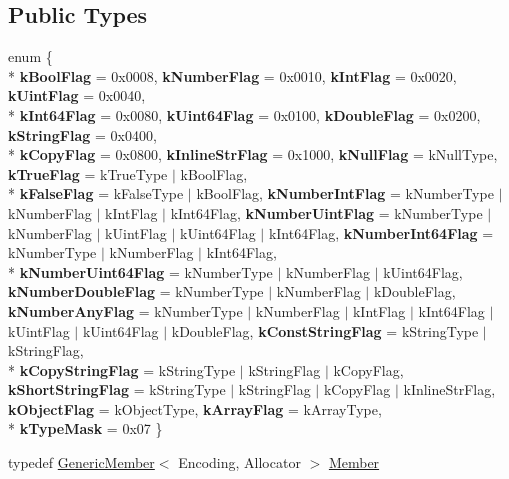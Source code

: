 \subsection*{Public Types}
\begin{DoxyCompactItemize}
\item 
enum \{ \\*
{\bfseries k\+Bool\+Flag} = 0x0008, 
{\bfseries k\+Number\+Flag} = 0x0010, 
{\bfseries k\+Int\+Flag} = 0x0020, 
{\bfseries k\+Uint\+Flag} = 0x0040, 
\\*
{\bfseries k\+Int64\+Flag} = 0x0080, 
{\bfseries k\+Uint64\+Flag} = 0x0100, 
{\bfseries k\+Double\+Flag} = 0x0200, 
{\bfseries k\+String\+Flag} = 0x0400, 
\\*
{\bfseries k\+Copy\+Flag} = 0x0800, 
{\bfseries k\+Inline\+Str\+Flag} = 0x1000, 
{\bfseries k\+Null\+Flag} = k\+Null\+Type, 
{\bfseries k\+True\+Flag} = k\+True\+Type $\vert$ k\+Bool\+Flag, 
\\*
{\bfseries k\+False\+Flag} = k\+False\+Type $\vert$ k\+Bool\+Flag, 
{\bfseries k\+Number\+Int\+Flag} = k\+Number\+Type $\vert$ k\+Number\+Flag $\vert$ k\+Int\+Flag $\vert$ k\+Int64\+Flag, 
{\bfseries k\+Number\+Uint\+Flag} = k\+Number\+Type $\vert$ k\+Number\+Flag $\vert$ k\+Uint\+Flag $\vert$ k\+Uint64\+Flag $\vert$ k\+Int64\+Flag, 
{\bfseries k\+Number\+Int64\+Flag} = k\+Number\+Type $\vert$ k\+Number\+Flag $\vert$ k\+Int64\+Flag, 
\\*
{\bfseries k\+Number\+Uint64\+Flag} = k\+Number\+Type $\vert$ k\+Number\+Flag $\vert$ k\+Uint64\+Flag, 
{\bfseries k\+Number\+Double\+Flag} = k\+Number\+Type $\vert$ k\+Number\+Flag $\vert$ k\+Double\+Flag, 
{\bfseries k\+Number\+Any\+Flag} = k\+Number\+Type $\vert$ k\+Number\+Flag $\vert$ k\+Int\+Flag $\vert$ k\+Int64\+Flag $\vert$ k\+Uint\+Flag $\vert$ k\+Uint64\+Flag $\vert$ k\+Double\+Flag, 
{\bfseries k\+Const\+String\+Flag} = k\+String\+Type $\vert$ k\+String\+Flag, 
\\*
{\bfseries k\+Copy\+String\+Flag} = k\+String\+Type $\vert$ k\+String\+Flag $\vert$ k\+Copy\+Flag, 
{\bfseries k\+Short\+String\+Flag} = k\+String\+Type $\vert$ k\+String\+Flag $\vert$ k\+Copy\+Flag $\vert$ k\+Inline\+Str\+Flag, 
{\bfseries k\+Object\+Flag} = k\+Object\+Type, 
{\bfseries k\+Array\+Flag} = k\+Array\+Type, 
\\*
{\bfseries k\+Type\+Mask} = 0x07
 \}\hypertarget{classGenericValue_aacdfd9d0f85a6161380a134e6d0c9d3c}{}\label{classGenericValue_aacdfd9d0f85a6161380a134e6d0c9d3c}

\item 
typedef \hyperlink{structGenericMember}{Generic\+Member}$<$ Encoding, Allocator $>$ \hyperlink{classGenericValue_a7ccf27c44058b4c11c3efc6473afb886}{Member}\hypertarget{classGenericValue_a7ccf27c44058b4c11c3efc6473afb886}{}\label{classGenericValue_a7ccf27c44058b4c11c3efc6473afb886}


\end{DoxyCompactItemize}
